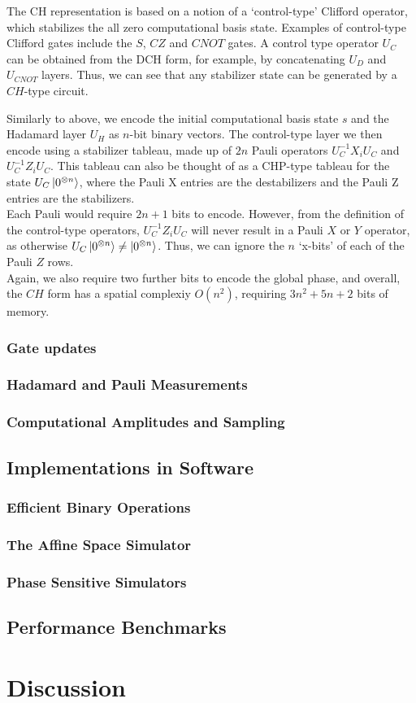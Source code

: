 The CH representation is based on a notion of a `control-type' Clifford operator, which stabilizes the all zero computational basis state. Examples of control-type Clifford gates include the $S$, $CZ$ and $CNOT$ gates. A control type operator $U_{C}$ can be obtained from the DCH form, for example, by concatenating $U_{D}$ and $U_{CNOT}$ layers. Thus, we can see that any stabilizer state can be generated by a $CH$-type circuit.\par
Similarly to above, we encode the initial computational basis state $s$ and the Hadamard layer $U_{H}$ as $n$-bit binary vectors. The control-type layer we then encode using a stabilizer tableau, made up of $2n$ Pauli operators
$U_{C}^{-1}X_{i}U_{C}$ and $U_{C}^{-1}Z_{i}U_{C}$. This tableau can also be thought of as a CHP-type tableau for the state $U_{C}\ket{0^{\otimes n}}$, where the Pauli X entries are the destabilizers and the Pauli Z entries are the stabilizers.\\
Each Pauli would require $2n+1$ bits to encode. However, from the definition of the control-type operators, $U_{C}^{-1}Z_{i}U_{C}$ will never result in a Pauli $X$ or $Y$ operator, as otherwise $U_{C}\ket{0^{\otimes n}}\neq\ket{0^{\otimes n}}$. Thus, we can ignore the $n$ `x-bits' of each of the Pauli $Z$ rows.\\
Again, we also require two further bits to encode the global phase, and overall, the $CH$ form  has a spatial complexiy $O(n^{2})$, requiring $3n^{2} + 5n+2$ bits of memory.
\subsubsection*{Gate updates}
\subsubsection*{Hadamard and Pauli Measurements}
\subsubsection*{Computational Amplitudes and Sampling}
\subsection{Implementations in Software}\label{sec:stabilizer_simulators}

\subsubsection*{Efficient Binary Operations}\label{sec:binary_ops}

\subsubsection*{The Affine Space Simulator}\label{sec:affine_space_sim}

\subsubsection*{Phase Sensitive Simulators}\label{sec:ps_sim}

\subsection{Performance Benchmarks}

\section{Discussion}
